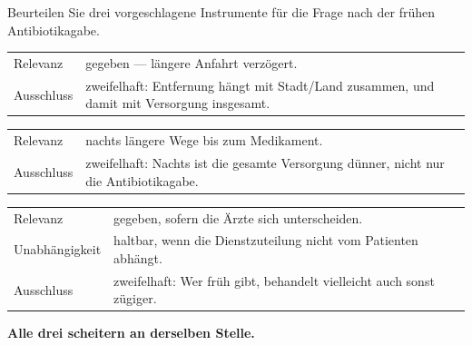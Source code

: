 \begin{aufgabe}
Beurteilen Sie drei vorgeschlagene Instrumente für die Frage nach der frühen Antibiotikagabe.

\loesung
{}
\begin{center}
{\small
\renewcommand{\arraystretch}{1.48}
\begin{tabular}{@{}P{2.4cm}P{5.8cm}@{}}
\toprule
Relevanz & gegeben --- längere Anfahrt verzögert.\\
Ausschluss & \textcolor{akzent}{zweifelhaft}: Entfernung hängt mit Stadt/Land zusammen, und damit mit Versorgung insgesamt.\\
\bottomrule
\end{tabular}}
\end{center}

\begin{center}
{\small
\renewcommand{\arraystretch}{1.48}
\begin{tabular}{@{}P{2.4cm}P{5.8cm}@{}}
\toprule
Relevanz & nachts längere Wege bis zum Medikament.\\
Ausschluss & \textcolor{akzent}{zweifelhaft}: Nachts ist die gesamte Versorgung dünner, nicht nur die Antibiotikagabe.\\
\bottomrule
\end{tabular}}
\end{center}

\begin{center}
{\small
\renewcommand{\arraystretch}{1.48}
\begin{tabular}{@{}P{2.8cm}P{5.4cm}@{}}
\toprule
Relevanz & gegeben, sofern die Ärzte sich unterscheiden.\\
Unabhängigkeit & haltbar, wenn die Dienstzuteilung nicht vom Patienten abhängt.\\
Ausschluss & \textcolor{akzent}{zweifelhaft}: Wer früh gibt, behandelt vielleicht auch sonst zügiger.\\
\bottomrule
\end{tabular}}
\end{center}

\begin{center}
\begin{minipage}{0.9\textwidth}
\textbf{Alle drei scheitern an derselben Stelle.}
\end{minipage}
\end{center}

\begin{center}
\begin{minipage}{0.88\textwidth}
\end{minipage}
\end{center}
\end{aufgabe}

